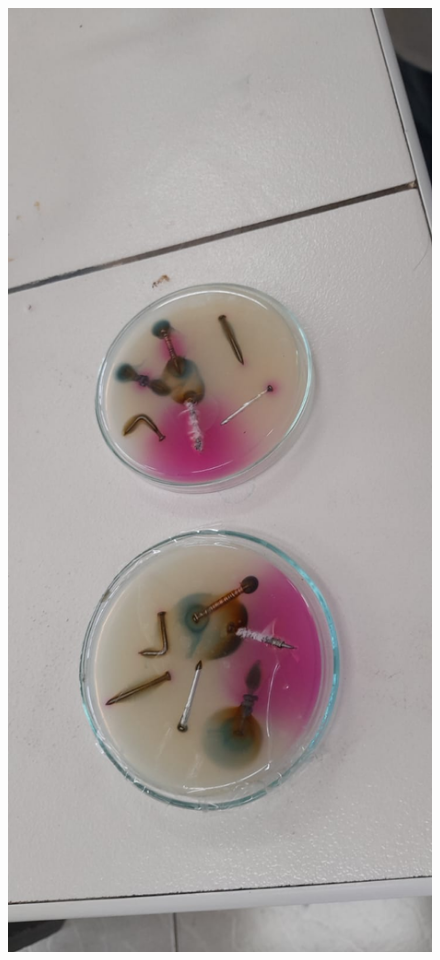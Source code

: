 \documentclass[11pt]{article}
\begin{document}
        \begin{figure}
            \centering
            \includegraphics[width=0.25 \textwidth]{Images/03.jpeg}
            \caption{}
        \end{figure}

    
\end{document}

